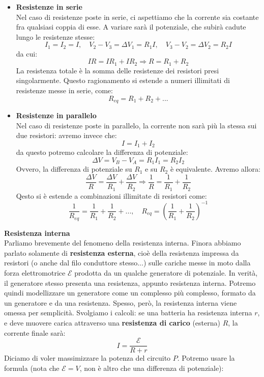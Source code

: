 \documentclass[a4paper,12pt]{article}
\begin{document}
\begin{itemize}
  \item \textbf{Resistenze in serie} \\
    Nel caso di resistenze poste in serie, ci aspettiamo che la corrente sia costante fra qualsiasi coppia di esse. A variare sarà il potenziale, che subirà cadute lungo le resistenze stesse:
    $$ I_1 = I_2 = I, \quad V_2 - V_3 = \Delta V_1 = R_1I, \quad V_3 - V_2 = \Delta V_2 = R_2I $$
    da cui:
    $$ IR = IR_1 + IR_2 \Rightarrow R = R_1 + R_2 $$
    La resistenza totale è la somma delle resistenze dei resistori presi singolarmente. Questo ragionamento si estende a numeri illimitati di resistenze messe in serie, come:
    $$ R_{eq} = R_1 + R_2 +... $$
  \item \textbf{Resistenze in parallelo} \\
    Nel caso di resistenze poste in parallelo, la corrente non sarà più la stessa sui due resistori: avremo invece che:
    $$ I = I_1 + I_2 $$
    da questo potremo calcolare la differenza di potenziale:
    $$ \Delta V = V_B - V_A = R_1 I_1 = R_2 I_2 $$
    Ovvero, la differenza di potenziale su $R_1$ e su $R_2$ è equivalente. Avremo allora:
    $$ \frac{\Delta V}{R} = \frac{\Delta V}{R_1} + \frac{\Delta V}{R_2} \Rightarrow \frac{1}{R} = \frac{1}{R_1} + \frac{1}{R_2} $$
    Qesto si è estende a combinazioni illimitate di resistori come:
    $$ \frac{1}{R_{eq}} = \frac{1}{R_1} + \frac{1}{R_2} + ... , \quad R_{eq} = \left( \frac{1}{R_1} + \frac{1}{R_2} \right)^{-1} $$
\end{itemize}
\par\smallskip
\textbf{Resistenza interna} \\
Parliamo brevemente del fenomeno della resistenza interna. Finora abbiamo parlato solamente di \textbf{resistenza esterna}, cioè
della resistenza impressa da resistori (o anche dal filo conduttore stesso...) sulle cariche messe in moto dalla forza elettromotrice $\mathcal{E}$ prodotta
da un qualche generatore di potenziale. In verità, il generatore stesso presenta una resistenza, appunto resistenza interna. Potremo quindi modellizzare
un generatore come un complesso più complesso, formato da un generatore e da una resistenza. Spesso, però, la resistenza interna viene omessa per semplicità.
Svolgiamo i calcoli: se una batteria ha resistenza interna $r$, e deve muovere carica attraverso una \textbf{resistenza di carico} (esterna) $R$, la corrente finale sarà:
$$ I = \frac{\mathcal{E}}{R + r} $$
Diciamo di voler massimizzare la potenza del circuito $P$. Potremo usare la formula (nota che $\mathcal{E} = V$, non è altro che una differenza di potenziale):
\end{document}
